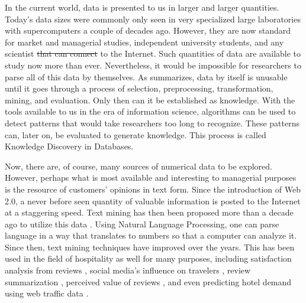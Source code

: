 \documentclass[smallextended,natbib]{svjour3}       %
\providecommand{\DIFadd}[1]{{\protect\color{blue}\uwave{#1}}} %
\providecommand{\DIFdel}[1]{{\protect\color{red}\sout{#1}}}                      %
\providecommand{\DIFaddbegin}{} %
\providecommand{\DIFaddend}{} %
\providecommand{\DIFdelbegin}{} %
\providecommand{\DIFdelend}{} %
\begin{document}
    In the current world, data is presented to us in larger and larger quantities. Today's data sizes were commonly only seen in very specialized large laboratories with supercomputers a couple of decades ago. However, they are now standard for market and managerial studies, independent university students, and any scientist \DIFdelbegin \DIFdel{that can connect }\DIFdelend \DIFaddbegin \DIFadd{connecting }\DIFaddend to the Internet. Such quantities of data are available to study now more than ever. Nevertheless, it would be impossible for researchers to parse all of this data by themselves. As \cite{fayyad1996data} summarizes, data by itself is unusable until it goes through a process of selection, preprocessing, transformation, mining, and evaluation. Only then can it be established as knowledge. With the tools available to us in the era of information science, algorithms can be used to detect patterns that would take researchers too long to recognize. These patterns can, later on, be evaluated to generate knowledge. This process is called Knowledge Discovery in Databases. 

    Now, there are, of course, many sources of numerical data to be explored.  However, perhaps what is most available and interesting to managerial purposes is the resource of customers' opinions in text form. Since the introduction of Web 2.0, a never before seen quantity of valuable information is posted to the Internet at a staggering speed. Text mining has then been proposed more than a decade ago to utilize this data \cite[e.g.][]{rajman1998text,nahm2002text}. Using Natural Language Processing, one can parse language in a way that translates to numbers so that a computer can analyze it. Since then, text mining techniques have improved over the years. This has been used in the field of hospitality as well for many purposes, including satisfaction analysis from reviews \cite[e.g][]{berezina2016, xu2016, xiang2015, hargreaves2015, balbi2018}, social media's influence on travelers \cite[e.g.][]{xiang2010}, review summarization \cite[e.g.][]{hu2017436}, perceived value of reviews \cite[e.g][]{FANG2016498}, and even predicting hotel demand using web traffic data \cite[e.g][]{yang2014}.
\end{document}

